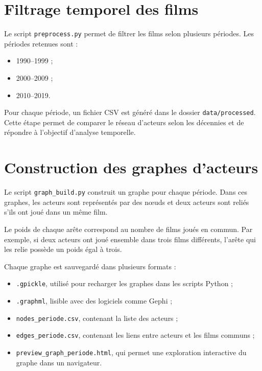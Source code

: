\documentclass[11pt,a4paper,oneside,openany]{report}
\begin{document}
\section{Filtrage temporel des films}

Le script \texttt{preprocess.py} permet de filtrer les films selon plusieurs périodes. Les périodes retenues sont :

\begin{itemize}
    \item 1990--1999 ;
    \item 2000--2009 ;
    \item 2010--2019.
\end{itemize}

Pour chaque période, un fichier CSV est généré dans le dossier \texttt{data/processed}. Cette étape permet de comparer le réseau d’acteurs selon les décennies et de répondre à l’objectif d’analyse temporelle.

\section{Construction des graphes d’acteurs}

Le script \texttt{graph\_build.py} construit un graphe pour chaque période. Dans ces graphes, les acteurs sont représentés par des nœuds et deux acteurs sont reliés s’ils ont joué dans un même film.

Le poids de chaque arête correspond au nombre de films joués en commun. Par exemple, si deux acteurs ont joué ensemble dans trois films différents, l’arête qui les relie possède un poids égal à trois.

Chaque graphe est sauvegardé dans plusieurs formats :

\begin{itemize}
    \item \texttt{.gpickle}, utilisé pour recharger les graphes dans les scripts Python ;
    \item \texttt{.graphml}, lisible avec des logiciels comme Gephi ;
    \item \texttt{nodes\_periode.csv}, contenant la liste des acteurs ;
    \item \texttt{edges\_periode.csv}, contenant les liens entre acteurs et les films communs ;
    \item \texttt{preview\_graph\_periode.html}, qui permet une exploration interactive du graphe dans un navigateur.
\end{itemize}
\end{document}
